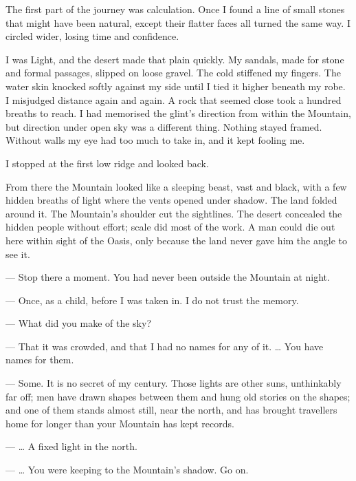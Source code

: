 The first part of the journey was calculation. Once I found a line of small stones that might have been natural, except their flatter faces all turned the same way. I circled wider, losing time and confidence.\par

I was Light, and the desert made that plain quickly. My sandals, made for stone and formal passages, slipped on loose gravel. The cold stiffened my fingers. The water skin knocked softly against my side until I tied it higher beneath my robe. I misjudged distance again and again. A rock that seemed close took a hundred breaths to reach. I had memorised the glint's direction from within the Mountain, but direction under open sky was a different thing. Nothing stayed framed. Without walls my eye had too much to take in, and it kept fooling me.\par

I stopped at the first low ridge and looked back.\par

From there the Mountain looked like a sleeping beast, vast and black, with a few hidden breaths of light where the vents opened under shadow. The land folded around it. The Mountain's shoulder cut the sightlines. The desert concealed the hidden people without effort; scale did most of the work. A man could die out here within sight of the Oasis, only because the land never gave him the angle to see it.\par

\ornament

\begin{room}

--- Stop there a moment. You had never been outside the Mountain at night.

--- Once, as a child, before I was taken in. I do not trust the memory.

--- What did you make of the sky?

--- That it was crowded, and that I had no names for any of it. \ldots{} You have names for them.

--- Some. It is no secret of my century. Those lights are other suns, unthinkably far off; men have drawn shapes between them and hung old stories on the shapes; and one of them stands almost still, near the north, and has brought travellers home for longer than your Mountain has kept records.

--- \ldots{} A fixed light in the north.

--- \ldots{} You were keeping to the Mountain's shadow. Go on.

\end{room}

